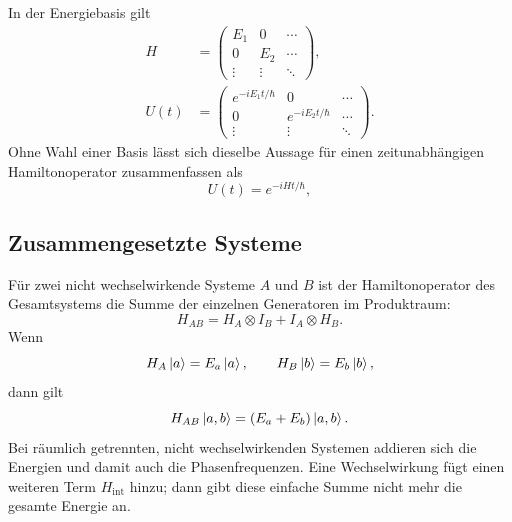 In der Energiebasis gilt
\begin{equation}
\begin{aligned}
H&=
\begin{pmatrix}
E_1&0&\cdots\\
0&E_2&\cdots\\
\vdots&\vdots&\ddots
\end{pmatrix},\\[0.6em]
U(t)&=
\begin{pmatrix}
e^{-iE_1t/\hbar}&0&\cdots\\
0&e^{-iE_2t/\hbar}&\cdots\\
\vdots&\vdots&\ddots
\end{pmatrix}.
\end{aligned}
\end{equation}
Ohne Wahl einer Basis lässt sich dieselbe Aussage für einen zeitunabhängigen Hamiltonoperator zusammenfassen als
\begin{equation}
\boxed{U(t)=e^{-iHt/\hbar}},
\end{equation}

\begin{classroomqa}
\end{classroomqa}

\subsection{Zusammengesetzte Systeme}

Für zwei nicht wechselwirkende Systeme \(A\) und \(B\) ist der Hamiltonoperator des Gesamtsystems die Summe der einzelnen Generatoren im Produktraum:
\begin{equation}
H_{AB}
=
H_A\otimes I_B+I_A\otimes H_B.
\end{equation}
Wenn
\begin{equation}
H_A\left\lvert a\right\rangle=E_a\left\lvert a\right\rangle,
\qquad
H_B\left\lvert b\right\rangle=E_b\left\lvert b\right\rangle,
\end{equation}
dann gilt
\begin{equation}
H_{AB}\left\lvert a,b\right\rangle=(E_a+E_b)\left\lvert a,b\right\rangle.
\end{equation}
Bei räumlich getrennten, nicht wechselwirkenden Systemen addieren sich die Energien und damit auch die Phasenfrequenzen. Eine Wechselwirkung fügt einen weiteren Term \(H_{\mathrm{int}}\) hinzu; dann gibt diese einfache Summe nicht mehr die gesamte Energie an.

